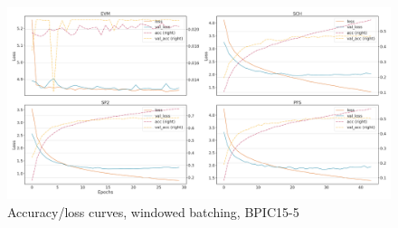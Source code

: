 \begin{figure}[!htb]
    \centering
    \includegraphics[width=\textwidth]{gfx/bpic2015_5/windowed_loss_acc_curve.png}
    \caption{Accuracy/loss curves, windowed batching, BPIC15-5}
\end{figure}
\FloatBarrier
